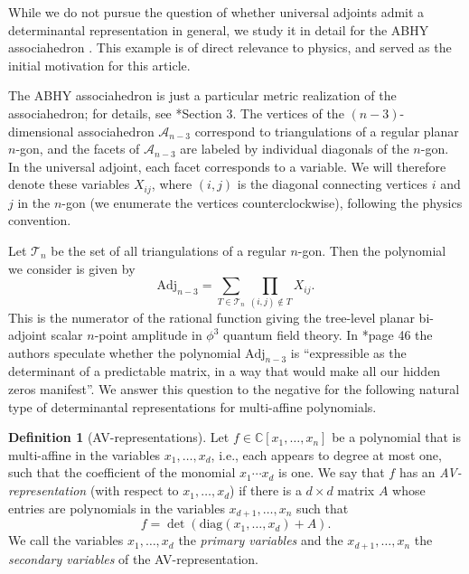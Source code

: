 \documentclass[a4paper,10pt]{amsart}
\theoremstyle{definition}
\newtheorem{Def}{Definition}[section]
\theoremstyle{plain}
\newcommand{\C}{{\mathbb C}}
\begin{document}
While we do not pursue the question of whether universal adjoints admit a determinantal representation in general, we study it in detail for the ABHY associahedron \cite{arkani2018scattering}. This example is of direct relevance to physics, and served as the initial motivation for this article. 

The ABHY associahedron is just a particular metric realization of the associahedron; for details, see \cite{arkani2018scattering}*{Section 3}. The vertices of the $(n-3)$-dimensional associahedron $\mathcal{A}_{n-3}$ correspond to triangulations of a regular planar $n$-gon, and the facets of $\mathcal{A}_{n-3}$ are labeled by individual diagonals of the $n$-gon. In the universal adjoint, each facet corresponds to a variable. We will therefore denote these variables $X_{ij}$, where $(i,j)$ is the diagonal connecting vertices $i$ and $j$ in the $n$-gon (we enumerate the vertices  counterclockwise), following the physics convention. 

Let $\mathcal{T}_{n}$ be the set of all triangulations of a regular $n$-gon. Then the polynomial we consider is given by 
$$\mathrm{Adj}_{n-3}=\sum_{T\in\mathcal{T}_{n}}\prod_{(i,j)\not\in T} X_{ij}.$$
This is the numerator of the rational function giving the tree-level planar bi-adjoint scalar $n$-point amplitude in $\phi^3$ quantum field theory. In \cite{arkani2024hidden}*{page 46} the authors speculate whether the polynomial $\mathrm{Adj}_{n-3}$ is ``expressible as the determinant of a predictable matrix, in
a way that would make all our hidden zeros manifest''.
We answer this question to the negative for the following natural type of determinantal representations for multi-affine polynomials.
\begin{Def}[AV-representations]\label{def:avrepresentation}
   Let $f\in\C[x_1,\ldots,x_n]$ be a polynomial that is multi-affine in the variables $x_1,\ldots,x_d$, i.e., each appears to degree at most one, such that the coefficient of the monomial $x_1\cdots x_d$ is one. We say that $f$ has an \emph{AV-representation} (with respect to $x_1,\ldots,x_d$) if there is a $d\times d$ matrix $A$ whose entries are polynomials in the variables $x_{d+1},\ldots,x_n$ such that 
   \begin{equation*}
       f=\det(\textrm{diag}(x_1,\ldots,x_d)+A).
   \end{equation*}
   We call the variables $x_1,\ldots,x_d$ the \emph{primary variables} and the $x_{d+1},\ldots,x_n$ the \emph{secondary variables} of the AV-representation.
\end{Def}
\end{document}

